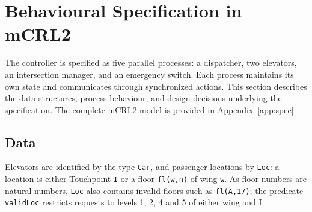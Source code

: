 \section{Behavioural Specification in mCRL2}
\label{sec:behavioural-specification}

The controller is specified as five parallel processes: a dispatcher, two elevators, an intersection manager, and an emergency switch. Each process maintains its own state and communicates through synchronized actions. This section describes the data structures, process behaviour, and design decisions underlying the specification. The complete mCRL2 model is provided in Appendix~\ref{app:spec}.


\subsection{Data}

\label{subsec:data}

Elevators are identified by the type \texttt{Car}, and passenger locations by \texttt{Loc}: a location is either Touchpoint \texttt{I} or a floor \texttt{fl(w,n)} of wing \texttt{w}. As floor numbers are natural numbers, \texttt{Loc} also contains invalid floors such as \texttt{fl(A,17)}; the predicate \texttt{validLoc} restricts requests to levels 1, 2, 4 and 5 of either wing and I. \\


